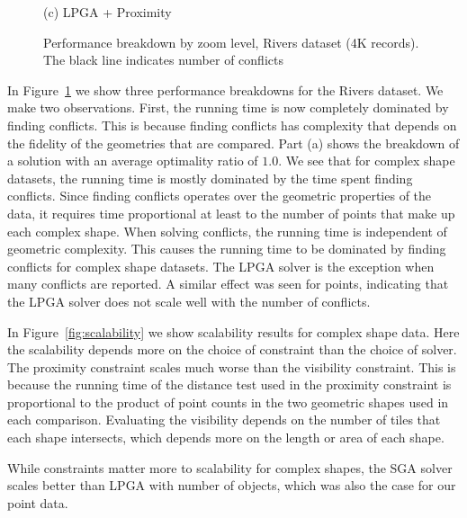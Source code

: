 \begin{figure}[tb]
\begin{minipage}{0.329\linewidth}
    \centerline{(c) LPGA + Proximity}
  \end{minipage}
  \vspace{-1ex}
  \caption{Performance breakdown by zoom level, Rivers dataset (4K records). The black line indicates number of conflicts} \label{fig:performance:complex}
  \vspace{-2ex}
\end{figure}


In Figure~\ref{fig:performance:complex} we show three performance breakdowns for the Rivers dataset. We make two observations. First, the running time is now completely dominated by finding conflicts. This is because finding conflicts has complexity that depends on the fidelity of the geometries that are compared. 
Part (a) shows the breakdown of a solution with an average optimality ratio of $1.0$. We see that for complex shape datasets, the running time is mostly dominated by the time spent finding conflicts. Since finding conflicts operates over the geometric properties of the data, it requires time proportional at least to the number of points that make up each complex shape. When solving conflicts, the running time is independent of geometric complexity. This causes the running time to be dominated by finding conflicts for complex shape datasets. The LPGA solver is the exception when many conflicts are reported. A similar effect was seen for points, indicating that the LPGA solver does not scale well with the number of conflicts. %



In Figure~\ref{fig:scalability} we show scalability results for complex shape data. Here the scalability depends more on the choice of constraint than the choice of solver. The proximity constraint scales much worse than the visibility constraint. This is because the running time of the distance test used in the proximity constraint is proportional to the product of point counts in the two geometric shapes used in each comparison. Evaluating the visibility depends on the number of tiles that each shape intersects, which depends more on the length or area of each shape. 

While constraints matter more to scalability for complex shapes, the SGA solver scales better than LPGA with number of objects, which was also the case for our point data.
